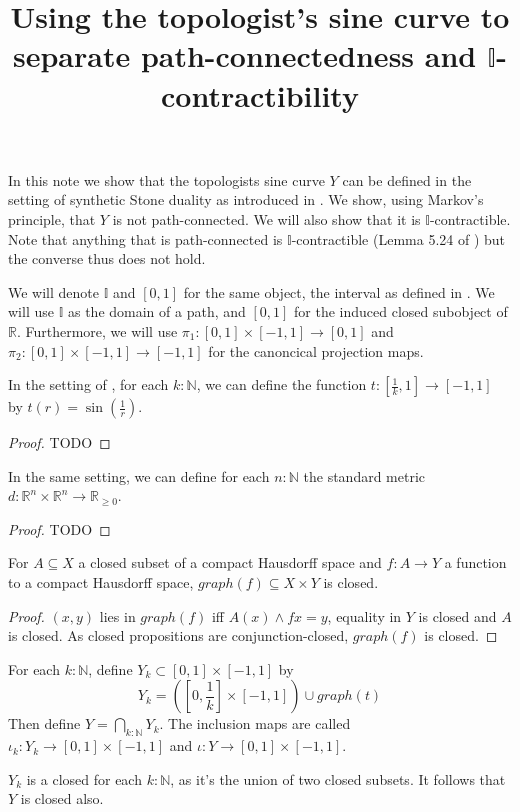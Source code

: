 \documentclass{../util/zariski}
\title{Using the topologist's sine curve to separate path-connectedness and $\mathbb I$-contractibility}
\begin{document}
In this note we show that the topologists sine curve $Y$ can be defined in the setting of 
synthetic Stone duality as introduced in \cite{synthetic-stone-duality}. 
We show, using Markov's principle, that $Y$ is not path-connected. 
We will also show that it is $\mathbb I$-contractible. 
Note that anything that is path-connected is $\mathbb I$-contractible 
(Lemma 5.24 of \cite{synthetic-stone-duality}) but the converse thus does not hold. 


\begin{remark}[on notation]
  We will denote $\mathbb I$ and $[0,1]$ for the same object, the interval as defined in \cite{synthetic-stone-duality}. 
  We will use $\mathbb I$ as the domain of a path, and $[0,1]$ for the induced closed subobject of $\mathbb R$. 
  Furthermore, we will use $\pi_1 : [0,1] \times [-1,1] \to [0,1] $ and $\pi_2: [0,1] \times [-1,1] \to [-1,1]$ 
  for the canoncical projection maps. 
\end{remark}

\begin{lemma}
  In the setting of \cite{synthetic-stone-duality}, 
  for each $k:\mathbb N$, we can define the function 
  $t:[\frac1k, 1] \to [-1,1]$ by $t(r) = \sin(\frac1r)$.
\end{lemma}
\begin{proof}
  TODO
\end{proof}
\begin{lemma}
  In the same setting, we can define for each $n:\mathbb N$ 
  the standard metric $d:\mathbb R^n \times \mathbb R^n \to \mathbb R_{\geq 0}$. 
\end{lemma}
\begin{proof}
  TODO
\end{proof}

\begin{lemma}
  For $A\subseteq X$ a closed subset of a compact Hausdorff space and 
  $f: A \to Y$ a function to a compact Hausdorff space, 
  $graph(f) \subseteq X \times Y$ is closed. 
\end{lemma}
\begin{proof}
  $(x,y)$ lies in $graph(f)$ iff $A(x) \wedge f x = y$, 
  equality in $Y$ is closed and $A$ is closed. 
  As closed propositions are conjunction-closed, $graph(f)$ is closed. 
\end{proof}
\begin{definition}
  For each $k:\mathbb N$, define $Y_k \subset [0,1] \times [-1,1]$ by 
  $$Y_k = ([0, \frac1k] \times [-1,1]) \cup graph(t)$$
  Then define $Y = \bigcap_{k:\mathbb N} Y_k$. 
  The inclusion maps are called $\iota_k : Y_k \to [0,1] \times [-1,1]$ 
  and $\iota:Y \to [0,1] \times [-1,1]$. 
\end{definition}
\begin{remark}
  $Y_k$ is a closed for each $k:\mathbb N$, 
  as it's the union of two closed subsets. 
  It follows that $Y$ is closed also. 
\end{remark}
\end{document}
